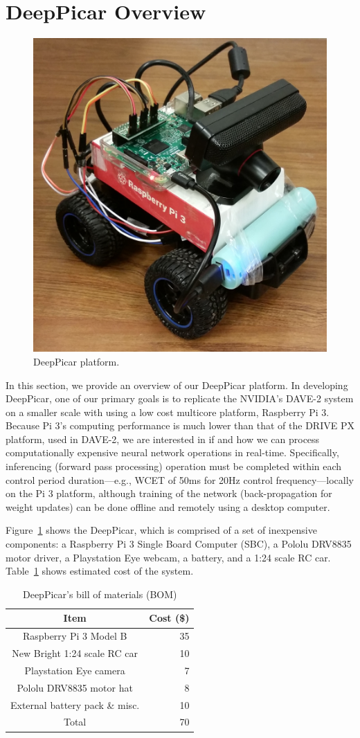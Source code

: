 \section{DeepPicar Overview}

\begin{figure}[t]
  \centering
  \includegraphics[width=.4\textwidth]{figs/DeepPicar_platform}
  \caption{DeepPicar platform.}
  \label{fig:overview}
\end{figure}

In this section, we provide an overview of our DeepPicar platform. In
developing DeepPicar, one of our primary goals is to replicate the
NVIDIA's DAVE-2 system on a smaller scale with using a low cost
multicore platform, Raspberry Pi 3. Because Pi 3's computing
performance is much lower than that of the DRIVE PX platform, used in
DAVE-2, we are interested in if and how we can process
computationally expensive neural network operations in
real-time. Specifically, inferencing (forward pass processing)
operation must be completed within each control period
duration---e.g., WCET of 50ms for 20Hz control frequency---locally on
the Pi 3 platform, although training of the network (back-propagation
for weight updates) can be done offline and remotely using a desktop
computer.

Figure~\ref{fig:overview} shows the DeepPicar, which is comprised of a
set of inexpensive components: a Raspberry Pi 3 Single Board Computer
(SBC), a Pololu DRV8835 motor driver, a Playstation Eye webcam, a
battery, and a 1:24 scale RC car. Table~\ref{tbl:carbom} shows
estimated cost of the system.

\begin{table}[t]
  \centering
  \begin{tabular}{|c|r|}
    \hline
    Item                    & Cost (\$) \\
    \hline
    Raspberry Pi 3 Model B  & 35 \\
    New Bright 1:24 scale RC car       & 10 \\
    Playstation Eye camera  &  7 \\
    Pololu DRV8835 motor hat&  8 \\
    External battery pack \& misc.   & 10 \\
    \hline
    Total                   & 70 \\
    \hline
  \end{tabular}
  \caption{DeepPicar's bill of materials (BOM)}
  \label{tbl:carbom}
\end{table}

